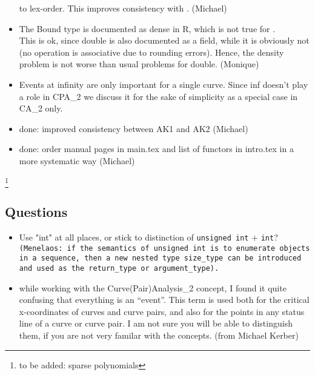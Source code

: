 \begin{itemize}
to lex-order. This improves consistency with . 
(Michael)
\item
The Bound type is documented as dense in R, which is not true
for .\\ 
This is ok, since double is also documented as a
field, while it is obviously not (no operation is associative
due to rounding errors). Hence, the density problem is not worse
than usual problems for double. (Monique)
\item 
Events at infinity are only important for a single curve. Since
inf doesn't play a role in CPA\_2 we discuss it for the sake of
simplicity as a special case in CA\_2 only. 
\item {} done: improved consistency between AK1 and AK2 (Michael)
\item {} done: order manual pages in main.tex and list of functors 
in intro.tex in a more systematic way (Michael)
\end{itemize}
\footnote{to be added: sparse polynomials}

\subsection{Questions}
\begin{itemize}
\item Use "int" at all places, or stick to distinction of \texttt{unsigned
   int} + \texttt{int}?\\
   \texttt{(Menelaos: if the semantics of \texttt{unsigned int} is to enumerate
   objects in a sequence, then a new nested type \texttt{size\_type}
   can be introduced and used as the \texttt{return\_type} or
   \texttt{argument\_type}).}
\item  while working with the Curve(Pair)Analysis\_2 concept,
I found it quite confusing that everything is an ``event''. This term is used
both for the critical x-coordinates of curves and curve pairs, and also
for the points in any status line of a curve or curve pair.
I am not sure you will be able to distinguish them, if you are not very
familar with the concepts.
(from Michael Kerber)
\end{itemize}

